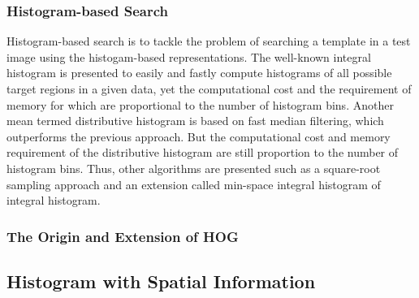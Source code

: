 \documentclass{article}
\begin{document}
\subsubsection{Histogram-based Search}
Histogram-based search is to tackle the problem of searching a template in a test image using the histogam-based representations. The well-known integral histogram is presented to easily and fastly compute histograms of all possible target regions in a given data, yet the computational cost and the requirement of memory for which are proportional to the number of histogram bins\cite{Porikli2005}. Another mean termed distributive histogram is based on fast median filtering, which outperforms the previous approach\cite{M.SizintsevK.G.Derpanis2008}. But the computational cost and memory requirement of the distributive histogram are still proportion to the number of histogram bins. Thus, other algorithms are presented such as a square-root sampling approach\cite{Chang2010} and an extension called min-space integral histogram of integral histogram\cite{Dubuisson2012}.
\subsubsection{The Origin and Extension of HOG}

\subsection{Histogram with Spatial Information}






\end{document}
